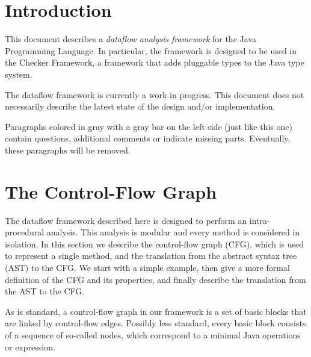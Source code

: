 
\section{Introduction}

This document describes a \emph{dataflow analysis framework} for the Java Programming Language.
In particular, the framework is designed to be used in the Checker Framework, a framework
that adds pluggable types to the Java type system.

\begin{workinprogress}
    The dataflow framework is currently a work in progress. This document does not necessarily describe
    the latest state of the design and/or implementation.
    
    Paragraphs colored in gray with a gray bar on the left side (just like this one)
    contain questions, additional comments or indicate missing parts. Eventually, these
    paragraphs will be removed.
\end{workinprogress}






\section{The Control-Flow Graph}
\label{sec:cfg}


The dataflow framework described here is designed to perform an intra-procedural analysis.
This analysis is modular and every method is considered in isolation. In this section
we describe the control-flow graph (CFG), which is used to represent a single method, and the
translation from the abstract syntax tree (AST) to the CFG. We start with a simple
example, then give a more formal definition of the CFG and its properties, and finally
describe the translation from the AST to the CFG.

As is standard, a control-flow graph in our framework is a set of basic blocks
that are linked by control-flow edges. Possibly less standard,
every basic block consists of a sequence
of so-called nodes, which correspond to a minimal Java operations or expression.




